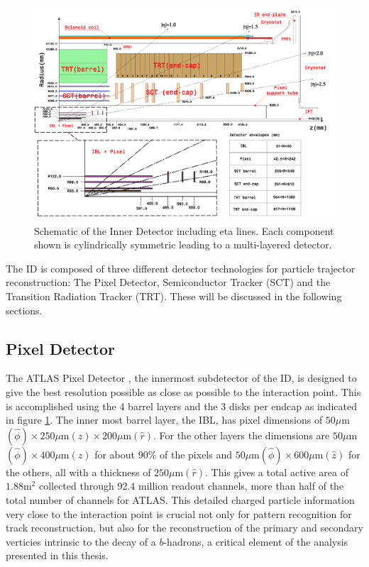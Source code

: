 \begin{figure}[!htbp]
  \begin{center}
    \includegraphics[width=0.8\linewidth]{figures/atlas/inner_detector_schematic}
    \caption{ \cite{PIX-2018-001} Schematic of the Inner Detector including eta
lines.  Each component shown is cylindrically symmetric leading to a
multi-layered detector.}
    \label{fig:inner_detector_schematic}
  \end{center}
\end{figure}

The ID is composed of three different detector technologies for particle
trajector reconstruction: The Pixel Detector, Semiconductor Tracker (SCT) and
the Transition Radiation Tracker (TRT).  These will be discussed in the
following sections. 

\subsection{Pixel Detector}

The ATLAS Pixel Detector \cite{PERF-2007-01}, the innermost subdetector of the ID, is designed to
give the best resolution possible as close as possible to the interaction point.
This is accomplished using the 4 barrel layers and the 3 disks per endcap as
indicated in figure \ref{fig:inner_detector_schematic}. The inner most barrel
layer, the IBL, has pixel dimensions of $50\mu $m$(\hat{\phi}) \times 250\mu $m$
(\hat{z}) \times 200\mu $m$(\hat{r})$.  For the other layers the dimensions are
$50\mu $m$(\hat{\phi}) \times 400\mu $m$(\hat{z})$ for about $90\%$ of the pixels
and $50\mu $m$(\hat{\phi}) \times 600\mu $m$(\hat{z})$ for the others, all with a
thickness of $250\mu $m$(\hat{r})$.  This gives a total active area of $1.88 $m$^2$
collected through 92.4 million readout channels, more than half of the total
number of channels for ATLAS. This detailed charged particle information very
close to the interaction point is crucial not only for pattern recognition for
track reconstruction, but also for the reconstruction of the primary and
secondary verticies intrinsic to the decay of a $b$-hadrons, a critical element
of the analysis presented in this thesis.

